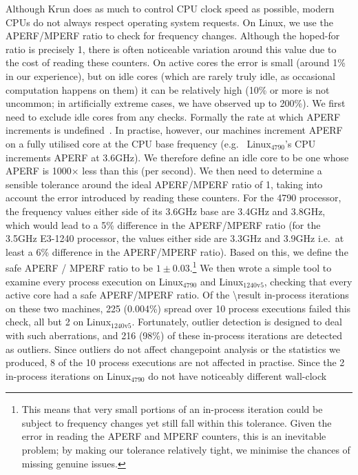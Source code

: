 \documentclass[acmsmall]{acmart}\settopmatter{printfolios=true}
\newcommand{\krun}{Krun\xspace}
\newcommand{\bencherfive}{Linux$_\mathrm{4790}$\xspace}
\newcommand{\bencherseven}{Linux$_\mathrm{1240v5}$\xspace}
\begin{document}
Although \krun does as much to control CPU clock speed as possible, modern CPUs
do not always respect operating system requests. On Linux, we use the
APERF/MPERF ratio to check for frequency changes. Although the hoped-for
ratio is precisely 1, there is often noticeable variation around this value due to the
cost of reading these counters. On active cores the error is small (around 1\% in our
experience), but on idle cores (which are rarely truly idle, as occasional
computation happens on them) it can be relatively high (10\% or more is
not uncommon; in artificially extreme cases, we have observed up to 200\%).
We first need to exclude idle cores from any checks. Formally
the rate at which APERF increments is undefined~\cite{intel17pstate}. In
practise, however, our machines increment APERF on a fully utilised core at the CPU base frequency
(e.g.~ \bencherfive's CPU increments APERF at $3.6$GHz).
We therefore define an idle core to be one whose APERF is 1000$\times$ less than this (per
second). We then need to determine a sensible tolerance around the ideal APERF/MPERF ratio of 1,
taking into account the error introduced by reading these counters.
For the 4790 processor, the frequency values either side of its 3.6GHz base
are 3.4GHz and 3.8GHz, which would lead to a 5\% difference in the APERF/MPERF
ratio (for the 3.5GHz E3-1240 processor, the values either side are 3.3GHz and 3.9GHz i.e.~at
least a 6\% difference in the APERF/MPERF ratio). Based on this, we define the
safe APERF / MPERF ratio to be $1\pm0.03$.\footnote{This means that very small
portions of an in-process iteration could be subject to frequency changes yet still fall within
this tolerance. Given the error in reading the APERF and MPERF counters, this is an
inevitable problem; by making our tolerance relatively tight, we minimise the
chances of missing genuine issues.} We then wrote a simple tool to examine
every process execution on \bencherfive and \bencherseven, checking that every
%
active core had a safe APERF/MPERF ratio. Of the \num{\result}\xspace in-process iterations
on these two machines, 225 (0.004\%) spread over 10 process executions failed
this check, all but 2 on \bencherseven. Fortunately, outlier detection is designed
to deal with such aberrations, and 216 (98\%) of these in-process iterations are
detected as outliers. Since outliers do not affect changepoint analysis or
the statistics we produced, 8 of the 10 process executions are not affected in practise.
Since the 2 in-process iterations on \bencherfive do not have noticeably different wall-clock
\end{document}
